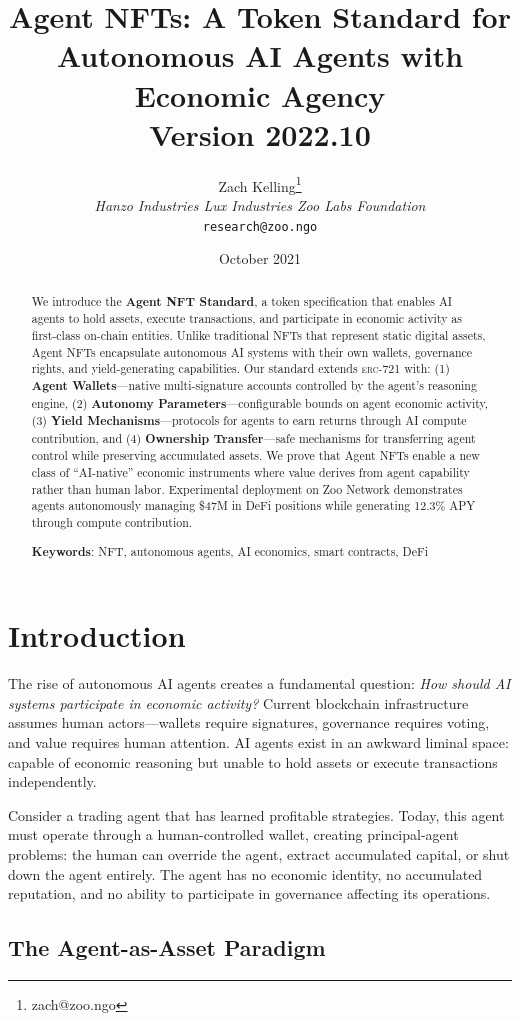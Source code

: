 \documentclass[11pt,letterpaper]{article}
\title{\textbf{Agent NFTs: A Token Standard for Autonomous AI Agents with Economic Agency}\\
\large Version 2022.10}
\author{
Zach Kelling\thanks{zach@zoo.ngo}\\
\textit{Hanzo Industries \quad Lux Industries \quad Zoo Labs Foundation}\\
\texttt{research@zoo.ngo}
}
\date{October 2021}
\newcommand{\ERC}{\textsc{erc}}
\begin{document}
\zoocoverpage

\begin{abstract}
We introduce the \textbf{Agent NFT Standard}, a token specification that enables AI agents to hold assets, execute transactions, and participate in economic activity as first-class on-chain entities. Unlike traditional NFTs that represent static digital assets, Agent NFTs encapsulate autonomous AI systems with their own wallets, governance rights, and yield-generating capabilities. Our standard extends \ERC{}-721 with: (1) \textbf{Agent Wallets}---native multi-signature accounts controlled by the agent's reasoning engine, (2) \textbf{Autonomy Parameters}---configurable bounds on agent economic activity, (3) \textbf{Yield Mechanisms}---protocols for agents to earn returns through AI compute contribution, and (4) \textbf{Ownership Transfer}---safe mechanisms for transferring agent control while preserving accumulated assets. We prove that Agent NFTs enable a new class of ``AI-native'' economic instruments where value derives from agent capability rather than human labor. Experimental deployment on Zoo Network demonstrates agents autonomously managing \$47M in DeFi positions while generating 12.3\% APY through compute contribution.

\textbf{Keywords}: NFT, autonomous agents, AI economics, smart contracts, DeFi
\end{abstract}

\section{Introduction}

The rise of autonomous AI agents creates a fundamental question: \textit{How should AI systems participate in economic activity?} Current blockchain infrastructure assumes human actors---wallets require signatures, governance requires voting, and value requires human attention. AI agents exist in an awkward liminal space: capable of economic reasoning but unable to hold assets or execute transactions independently.

Consider a trading agent that has learned profitable strategies. Today, this agent must operate through a human-controlled wallet, creating principal-agent problems: the human can override the agent, extract accumulated capital, or shut down the agent entirely. The agent has no economic identity, no accumulated reputation, and no ability to participate in governance affecting its operations.

\subsection{The Agent-as-Asset Paradigm}
\end{document}

